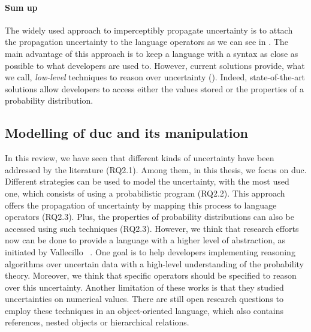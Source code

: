 \paragraph{Sum up}
The widely used approach to imperceptibly propagate uncertainty is to attach the propagation uncertainty to the language operators as we can see in .
The main advantage of this approach is to keep a language with a syntax as close as possible to what developers are used to.
However, current solutions provide, what we call, \textit{low-level} techniques to reason over uncertainty (\cf {}).
Indeed, state-of-the-art solutions allow developers to access either the values stored or the properties of a probability distribution.

\subsection[Modelling of data uncertainty and its manipulation]{Modelling of \gls{duc} and its manipulation}

In this review, we have seen that different kinds of uncertainty have been addressed by the literature (RQ2.1).
Among them, in this thesis, we focus on \gls{duc}.
Different strategies can be used to model the uncertainty, with the most used one, which consists of using a probabilistic program (RQ2.2).
This approach offers the propagation of uncertainty by mapping this process to language operators (RQ2.3).
Plus, the properties of probability distributions can also be accessed using such techniques  (RQ2.3).
However, we think that research efforts now can be done to provide a language with a higher level of abstraction, as initiated by Vallecillo \etal~\cite{DBLP:conf/quatic/VallecilloMO16}.
One goal is to help developers implementing reasoning algorithms over uncertain data with a high-level understanding of the probability theory.
Moreover, we think that specific operators should be specified to reason over this uncertainty.
Another limitation of these works is that they studied uncertainties on numerical values.
There are still open research questions to employ these techniques in an object-oriented language, which also contains references, nested objects or hierarchical relations.  



















